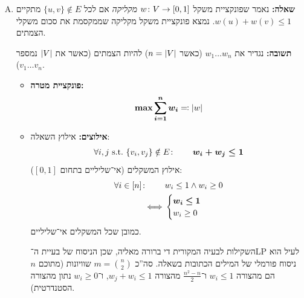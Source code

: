 \documentclass[]{../../../../tex/classes/homework}
\begin{document}
	\begin{enumerate}[(A)]
		\item \textbf{שאלה: }נאמר שפונקציית משקל $w \colon V \to [0, 1]$ \textit{מקליקה} אם לכל $\{u, v\}\notin E$ מתקיים $w(u) + w(v) \le 1$. נמצא פונקציית משקל מקליקה שממקסמת את סכום משקלי הצמתים. 
		
		\textbf{תשובה: }נגדיר את $w_1 \dots w_n$ (כאשר $n = \left \lvert V \right \rvert$) להיות הצמתים (כאשר את $\left \lvert V \right \rvert$ נמספר $v_1 \dots v_n$). 
		\begin{itemize}
			\item \textbf{פונקציית מטרה: }
			\[ \bm{\max \sum_{i =1}^{n}w_i} \eqqcolon \left \lvert w \right \rvert \]
			\item \textbf{אילוצים: }אילוץ השאלה: 
			\begin{align*}
				\forall i, j \ \mathrm{s.t. }\ \{v_i, v_j\}\notin E\colon \quad\quad &\bm{{w_i + w_j \le 1}} \\
			\end{align*}
			אילוץ המשקלים (אי־שליליים בתחום $[0, 1]$): 
			\begin{align*}
				\forall i \in [n]\colon\quad\quad &w_i \le 1 \land w_i \ge 0 \\
				\iff &\begin{cases}
					\bm{w_i \le 1} \\
					w_i \ge 0
				\end{cases}
			\end{align*}
			כמובן שכל המשקלים אי־שליליים. 
			
			השקילות לבעיה המקורית די ברורה מאליה, שכן הניסוח של בעיית ה־LP לעיל הוא ניסוח פורמלי של המילים הכתובות בשאלה. סה''כ $m = \binom{n}{2}$ שוויונות (מתוכם $n$ הם מהצורה $w_i\le 1$ ו־$\frac{n^{2} - n}{2}$ מהצורה $w_j + w_i \le 1$, ו־$w_i \ge 0$ נתון מהצורה הסטנדרטית). 
			

\end{itemize}
\end{enumerate}
\end{document}
